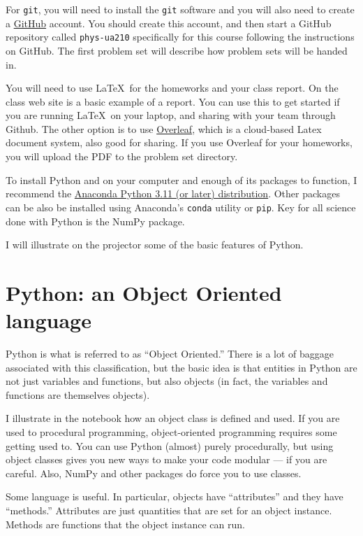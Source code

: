 For {\tt git}, you will need to install the {\tt git} software and you
will also need to create a \href{http://github.com}{\color{red}
GitHub} account. You should create this account, and then start a
GitHub repository called {\tt phys-ua210} specifically for this course
following the instructions on GitHub. The first problem set will
describe how problem sets will be handed in.

You will need to use \LaTeX\ for the homeworks and your class
report. On the class web site is a basic example of a report. You can
use this to get started if you are running \LaTeX\ on your laptop, and
sharing with your team through Github. The other option is to use
\href{http://overleaf.com}{\color{red} Overleaf}, which is a
cloud-based Latex document system, also good for sharing. If you use
Overleaf for your homeworks, you will upload the PDF to the problem
set directory.

To install Python and on your computer and enough of its packages to
function, I recommend the
\href{https://www.continuum.io/downloads}{\color{red} Anaconda Python
  3.11 (or later) distribution}. Other packages can be also be
installed using Anaconda's {\tt conda} utility or {\tt pip}. Key for
all science done with Python is the NumPy package.

I will illustrate on the projector some of the basic features of
Python.

\section{Python: an Object Oriented language}

Python is what is referred to as ``Object Oriented.'' There is a lot
of baggage associated with this classification, but the basic idea is
that entities in Python are not just variables and functions, but also
objects (in fact, the variables and functions are themselves
objects). 

I illustrate in the notebook how an object class is defined and
used. If you are used to procedural programming, object-oriented
programming requires some getting used to. You can use Python (almost)
purely procedurally, but using object classes gives you new ways to
make your code modular --- if you are careful. Also, NumPy and other
packages do force you to use classes. 

Some language is useful. In particular, objects have ``attributes''
and they have ``methods.'' Attributes are just quantities that are set
for an object instance. Methods are functions that the object instance
can run. 

